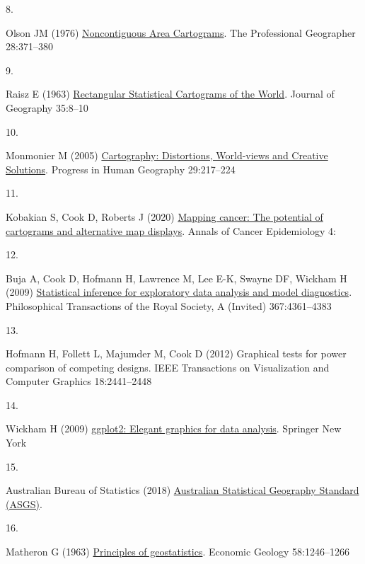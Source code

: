 \documentclass[
]{article}
\newlength{\cslhangindent}
\newlength{\csllabelwidth}
\newenvironment{CSLReferences}[2] %
 {\begin{list}{}{%
  \setlength{\itemindent}{0pt}
  \setlength{\leftmargin}{0pt}
  \setlength{\parsep}{0pt}
  \ifodd #1
   \setlength{\leftmargin}{\cslhangindent}
   \setlength{\itemindent}{-1\cslhangindent}
  \fi
  \setlength{\itemsep}{#2\baselineskip}}}
 {\end{list}}
\newcommand{\CSLLeftMargin}[1]{\parbox[t]{\csllabelwidth}{\strut#1\strut}}
\newcommand{\CSLRightInline}[1]{\parbox[t]{\linewidth - \csllabelwidth}{\strut#1\strut}}
\begin{document}
\begin{CSLReferences}{0}{1}
\CSLLeftMargin{8. }%
\CSLRightInline{Olson JM (1976)
\href{https://doi.org/10.1111/j.0033-0124.1976.00371.x}{{Noncontiguous
Area Cartograms}}. The Professional Geographer 28:371--380}

\CSLLeftMargin{9. }%
\CSLRightInline{Raisz E (1963)
\href{https://doi.org/10.1080/00221343608987880}{{Rectangular
Statistical Cartograms of the World}}. Journal of Geography 35:8--10}

\CSLLeftMargin{10. }%
\CSLRightInline{Monmonier M (2005)
\href{https://doi.org/10.1191/0309132505ph540pr}{{Cartography:
Distortions, World-views and Creative Solutions}}. Progress in Human
Geography 29:217--224}

\CSLLeftMargin{11. }%
\CSLRightInline{Kobakian S, Cook D, Roberts J (2020)
\href{https://ace.amegroups.com/article/view/6040}{Mapping cancer: The
potential of cartograms and alternative map displays}. Annals of Cancer
Epidemiology 4:}

\CSLLeftMargin{12. }%
\CSLRightInline{Buja A, Cook D, Hofmann H, Lawrence M, Lee E-K, Swayne
DF, Wickham H (2009)
\href{https://doi.org/10.1098/rsta.2009.0120}{Statistical inference for
exploratory data analysis and model diagnostics}. Philosophical
Transactions of the Royal Society, A (Invited) 367:4361--4383}

\CSLLeftMargin{13. }%
\CSLRightInline{Hofmann H, Follett L, Majumder M, Cook D (2012)
Graphical tests for power comparison of competing designs. IEEE
Transactions on Visualization and Computer Graphics 18:2441--2448}

\CSLLeftMargin{14. }%
\CSLRightInline{Wickham H (2009)
\href{http://had.co.nz/ggplot2/book}{ggplot2: Elegant graphics for data
analysis}. Springer New York}

\CSLLeftMargin{15. }%
\CSLRightInline{Australian Bureau of Statistics (2018)
\href{https://www.abs.gov.au/statistics/statistical-geography/australian-statistical-geography-standard-asgs}{{Australian
Statistical Geography Standard (ASGS)}}. }

\CSLLeftMargin{16. }%
\CSLRightInline{Matheron G (1963)
\href{http://dx.doi.org/10.2113/gsecongeo.58.8.1246}{Principles of
geostatistics}. Economic Geology 58:1246--1266}


\end{CSLReferences}
\end{document}
